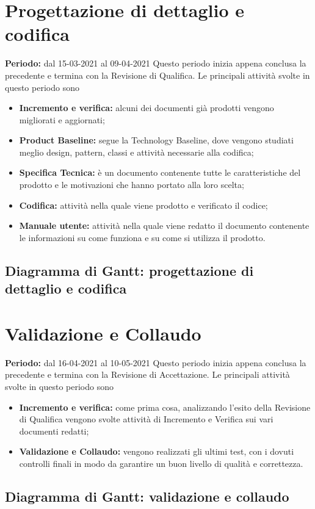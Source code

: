 \section{Progettazione di dettaglio e codifica}\label{4.4}
\textbf{Periodo:} dal 15-03-2021 al 09-04-2021
Questo periodo inizia appena conclusa la precedente e termina con la Revisione di Qualifica.
Le principali attività svolte in questo periodo sono
\begin{itemize}
	\item \textbf{Incremento e verifica:} alcuni dei documenti già prodotti vengono migliorati e aggiornati;
	\item \textbf{Product Baseline:} segue la Technology Baseline, dove vengono studiati meglio design, pattern, classi e attività necessarie alla codifica;
	\item \textbf{Specifica Tecnica:} è un documento contenente tutte le caratteristiche del prodotto e le motivazioni che hanno portato alla loro scelta;
	\item \textbf{Codifica:} attività nella quale viene prodotto e verificato il codice;
	\item \textbf{Manuale utente:} attività nella quale viene redatto il documento contenente le informazioni su come funziona e su come si utilizza il prodotto.
\end{itemize}
\subsection{Diagramma di Gantt: progettazione di dettaglio e codifica}\label{4.4.1}

\section{Validazione e Collaudo}\label{4.5}
\textbf{Periodo:} dal 16-04-2021 al 10-05-2021
Questo periodo inizia appena conclusa la precedente e termina con la Revisione di Accettazione.
Le principali attività svolte in questo periodo sono
\begin{itemize}
	\item \textbf{Incremento e verifica:} come prima cosa, analizzando l'esito della Revisione di Qualifica vengono svolte attività di Incremento e Verifica sui vari documenti redatti;
	\item \textbf{Validazione e Collaudo:} vengono realizzati gli ultimi test, con i dovuti controlli finali in modo da garantire un buon livello di qualità e correttezza.
\end{itemize}
\subsection{Diagramma di Gantt: validazione e collaudo}\label{4.5.1}